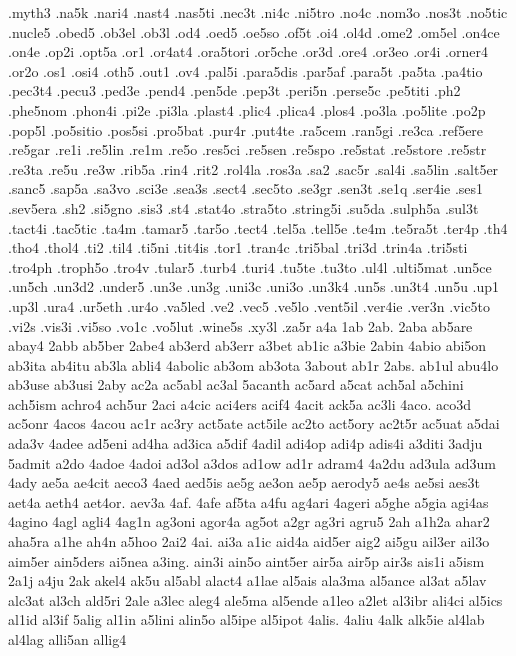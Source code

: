{.myth3
.na5k
.nari4
.nast4
.nas5ti
.nec3t
.ni4c
.ni5tro
.no4c
.nom3o
.nos3t
.no5tic
.nucle5
.obed5
.ob3el
.ob3l
.od4
.oed5
.oe5so
.of5t
.oi4
.ol4d
.ome2
.om5el
.on4ce
.on4e
.op2i
.opt5a
.or1
.or4at4
.ora5tori
.or5che
.or3d
.ore4
.or3eo
.or4i
.orner4
.or2o
.os1
.osi4
.oth5
.out1
.ov4
.pal5i
.para5dis
.par5af
.para5t
.pa5ta
.pa4tio
.pec3t4
.pecu3
.ped3e
.pend4
.pen5de
.pep3t
.peri5n
.perse5c
.pe5titi
.ph2
.phe5nom
.phon4i
.pi2e
.pi3la
.plast4
.plic4
.plica4
.plos4
.po3la
.po5lite
.po2p
.pop5l
.po5sitio
.pos5si
.pro5bat
.pur4r
.put4te
.ra5cem
.ran5gi
.re3ca
.ref5ere
.re5gar
.re1i
.re5lin
.re1m
.re5o
.res5ci
.re5sen
.re5spo
.re5stat
.re5store
.re5str
.re3ta
.re5u
.re3w
.rib5a
.rin4
.rit2
.rol4la
.ros3a
.sa2
.sac5r
.sal4i
.sa5lin
.salt5er
.sanc5
.sap5a
.sa3vo
.sci3e
.sea3s
.sect4
.sec5to
.se3gr
.sen3t
.se1q
.ser4ie
.ses1
.sev5era
.sh2
.si5gno
.sis3
.st4
.stat4o
.stra5to
.string5i
.su5da
.sulph5a
.sul3t
.tact4i
.tac5tic
.ta4m
.tamar5
.tar5o
.tect4
.tel5a
.tell5e
.te4m
.te5ra5t
.ter4p
.th4
.tho4
.thol4
.ti2
.til4
.ti5ni
.tit4is
.tor1
.tran4c
.tri5bal
.tri3d
.trin4a
.tri5sti
.tro4ph
.troph5o
.tro4v
.tular5
.turb4
.turi4
.tu5te
.tu3to
.ul4l
.ulti5mat
.un5ce
.un5ch
.un3d2
.under5
.un3e
.un3g
.uni3c
.uni3o
.un3k4
.un5s
.un3t4
.un5u
.up1
.up3l
.ura4
.ur5eth
.ur4o
.va5led
.ve2
.vec5
.ve5lo
.vent5il
.ver4ie
.ver3n
.vic5to
.vi2s
.vis3i
.vi5so
.vo1c
.vo5lut
.wine5s
.xy3l
.za5r
a4a
1ab
2ab.
2aba
ab5are
abay4
2abb
ab5ber
2abe4
ab3erd
ab3err
a3bet
ab1ic
a3bie
2abin
4abio
abi5on
ab3ita
ab4itu
ab3la
abli4
4abolic
ab3om
ab3ota
3about
ab1r
2abs.
ab1ul
abu4lo
ab3use
ab3usi
2aby
ac2a
ac5abl
ac3al
5acanth
ac5ard
a5cat
ach5al
a5chini
ach5ism
achro4
ach5ur
2aci
a4cic
aci4ers
acif4
4acit
ack5a
ac3li
4aco.
aco3d
ac5onr
4acos
4acou
ac1r
ac3ry
act5ate
act5ile
ac2to
act5ory
ac2t5r
ac5uat
a5dai
ada3v
4adee
ad5eni
ad4ha
ad3ica
a5dif
4adil
adi4op
adi4p
adis4i
a3diti
3adju
5admit
a2do
4adoe
4adoi
ad3ol
a3dos
ad1ow
ad1r
adram4
4a2du
ad3ula
ad3um
4ady
ae5a
ae4cit
aeco3
4aed
aed5is
ae5g
ae3on
ae5p
aerody5
ae4s
ae5si
aes3t
aet4a
aeth4
aet4or.
aev3a
4af.
4afe
af5ta
a4fu
ag4ari
4ageri
a5ghe
a5gia
agi4as
4agino
4agl
agli4
4ag1n
ag3oni
agor4a
ag5ot
a2gr
ag3ri
agru5
2ah
a1h2a
ahar2
aha5ra
a1he
ah4n
a5hoo
2ai2
4ai.
ai3a
a1ic
aid4a
aid5er
aig2
ai5gu
ail3er
ail3o
aim5er
ain5ders
ai5nea
a3ing.
ain3i
ain5o
aint5er
air5a
air5p
air3s
ais1i
a5ism
2a1j
a4ju
2ak
akel4
ak5u
al5abl
alact4
a1lae
al5ais
ala3ma
al5ance
al3at
a5lav
alc3at
al3ch
ald5ri
2ale
a3lec
aleg4
ale5ma
al5ende
a1leo
a2let
al3ibr
ali4ci
al5ics
al1id
al3if
5alig
al1in
a5lini
alin5o
al5ipe
al5ipot
4alis.
4aliu
4alk
alk5ie
al4lab
al4lag
alli5an
allig4
}
